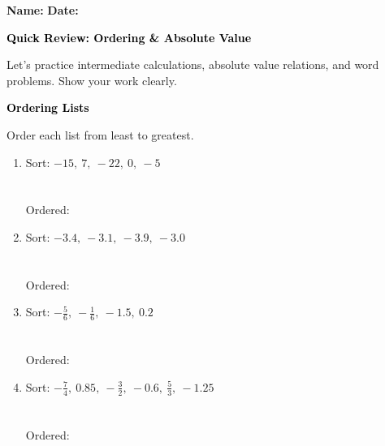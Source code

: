 \documentclass[12pt, letterpaper, fleqn]{article}
\newcommand{\blanklong}{\underline{\hspace{6.5cm}}}
\begin{document}
\textbf{Name:} \underline{\hspace{5cm}}
\hfill
\textbf{Date:} \underline{\hspace{3cm}}\\

\begin{tcolorbox}[colback=black!10]
    \large\textcolor{black}{\textbf{Quick Review: Ordering \& Absolute Value}}
\end{tcolorbox}

\vspace{3mm}
\noindent
Let's practice intermediate calculations, absolute value relations, and word problems. Show your work clearly.

\vspace{4mm}

\begin{tcolorbox}[colback=black!10]
\large\textcolor{black}{\textbf{Ordering Lists}}
\end{tcolorbox}

\noindent
Order each list from least to greatest.

\vspace{3mm}

\begin{enumerate}[itemsep=1cm, leftmargin=0.6cm]

\item Sort: $-15, \ 7, \ -22, \ 0, \ -5$ \\ \\ \\
Ordered: \blanklong

\vspace{0.6cm}

\item Sort: $-3.4, \ -3.1, \ -3.9, \ -3.0$ \\ \\ \\
Ordered: \blanklong

\vspace{0.6cm}

\item Sort: $-\frac{5}{6}, \ -\frac{1}{6}, \ -1.5, \ 0.2$ \\ \\ \\
Ordered: \blanklong

\vspace{0.6cm}

\item Sort: $-\frac{7}{4}, \ 0.85, \ -\frac{3}{2}, \ -0.6, \ \frac{5}{3}, \ -1.25$ \\ \\ \\
Ordered: \blanklong
\vspace{0.6cm}
\end{enumerate}
\end{document}
